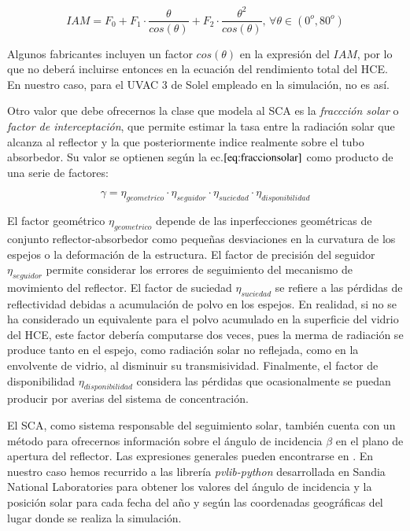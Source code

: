 \begin{equation}
   IAM = F_0 + F_1 \cdot \frac{\theta}{cos(\theta)} + F_2 \cdot \frac{\theta^2}{cos(\theta)},\, \forall   
 \theta \in (0^o, 80^o)
    \label{eq:iam}
\end{equation}

Algunos fabricantes incluyen un factor \(cos(\theta)\) en la expresión del \(IAM\), por lo que no deberá incluirse entonces en la ecuación del rendimiento total del HCE. En nuestro caso, para el UVAC 3 de Solel empleado en la simulación, no es así.

Otro valor que debe ofrecernos la clase que modela al SCA es la \emph{fraccción solar} o \emph{factor de interceptación}, que permite estimar la tasa entre la radiación solar que alcanza al reflector y la que posteriormente indice realmente sobre el tubo absorbedor. Su valor se optienen según la ec.\(\eqref{eq:fraccionsolar}\) como producto de una serie de factores: 

\begin{equation}
   \gamma = \eta_{geometrico} \cdot \eta_{seguidor} \cdot \eta_{suciedad} \cdot \eta_{disponibilidad}
    \label{eq:fraccionsolar}
\end{equation}

El factor geométrico \(\eta_{geometrico}\) depende de las inperfecciones geométricas de conjunto reflector-absorbedor como pequeñas desviaciones en la curvatura de los espejos o la deformación de la estructura. El factor de precisión del seguidor \(\eta_{seguidor}\) permite considerar los errores de seguimiento del mecanismo de movimiento del reflector. El factor de suciedad \(\eta_{suciedad}\) se refiere a las pérdidas de reflectividad debidas a acumulación de polvo en los espejos. En realidad, si no se ha considerado un equivalente para el polvo acumulado en la superficie del vidrio del HCE, este factor debería computarse dos veces, pues la merma de radiación se produce tanto en el espejo, como radiación solar no reflejada, como en la envolvente de vidrio, al disminuir su transmisividad. Finalmente, el factor de disponibilidad \(\eta_{disponibilidad}\) considera las pérdidas que ocasionalmente se puedan producir por averias del sistema de concentración.

El SCA, como sistema responsable del seguimiento solar, también cuenta con un método para ofrecernos información sobre el ángulo de incidencia \(\beta\) en el plano de apertura del reflector. Las expresiones generales pueden encontrarse en \cite{1022085/95AM6AQN}. En nuestro caso hemos recurrido a las librería \emph{pvlib-python} \cite{1022085/GUC54R5I} desarrollada en Sandia National Laboratories para obtener los valores del ángulo de incidencia y la posición solar para cada fecha del año y según las coordenadas geográficas del lugar donde se realiza la simulación.

